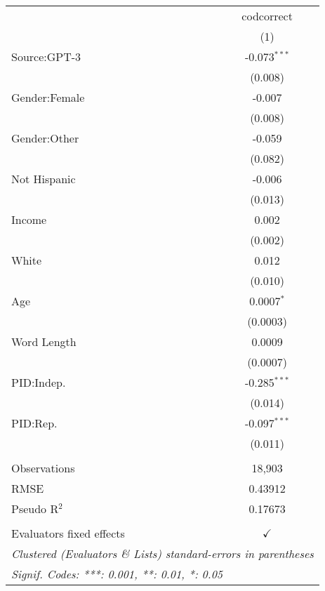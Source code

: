 
\begingroup
\centering
\begin{tabular}{lc}
   \toprule
                            & codcorrect\\  
                            & (1)\\  
   \midrule 
   Source:GPT-3             & -0.073$^{***}$\\   
                            & (0.008)\\   
   Gender:Female            & -0.007\\   
                            & (0.008)\\   
   Gender:Other             & -0.059\\   
                            & (0.082)\\   
   Not Hispanic             & -0.006\\   
                            & (0.013)\\   
   Income                   & 0.002\\   
                            & (0.002)\\   
   White                    & 0.012\\   
                            & (0.010)\\   
   Age                      & 0.0007$^{*}$\\   
                            & (0.0003)\\   
   Word Length              & 0.0009\\   
                            & (0.0007)\\   
   PID:Indep.               & -0.285$^{***}$\\   
                            & (0.014)\\   
   PID:Rep.                 & -0.097$^{***}$\\   
                            & (0.011)\\   
    \\
   Observations             & 18,903\\  
   RMSE                     & 0.43912\\  
   Pseudo R$^2$             & 0.17673\\  
    \\
   Evaluators fixed effects & $\checkmark$\\   
   \bottomrule
   \multicolumn{2}{l}{\emph{Clustered (Evaluators \& Lists) standard-errors in parentheses}}\\
   \multicolumn{2}{l}{\emph{Signif. Codes: ***: 0.001, **: 0.01, *: 0.05}}\\
\end{tabular}
\par\endgroup


